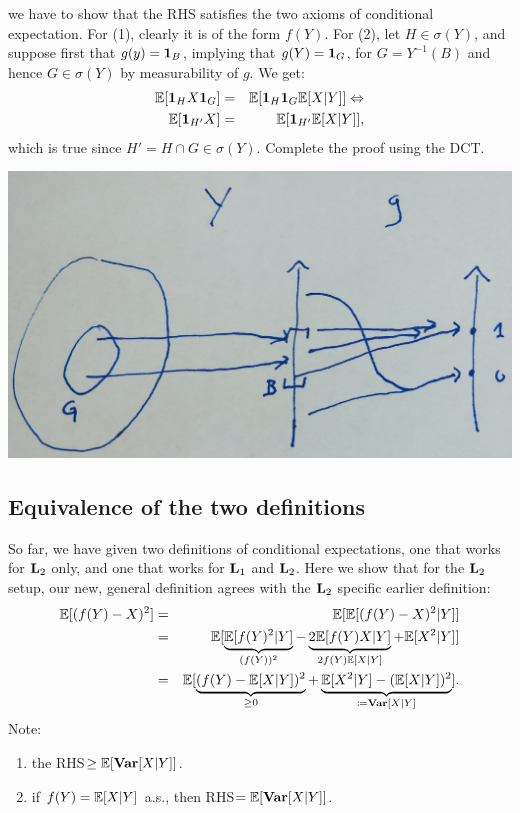 \documentclass{article}
\begin{document}
 we have to show that the RHS satisfies the two axioms of conditional expectation. For (1), clearly it is of the form $f(Y)$. For (2), let $H \in \sigma(Y)$, and suppose first that $g(y) = {\mathbf 1}_B$, implying that $g(Y) = {\mathbf 1}_G$, for $G = Y^{-1}(B)$ and hence $G \in \sigma(Y)$ by measurability of $g$. We get:
\begin{eqnarray*}
{\mathbb E}[ {\mathbf 1}_H X {\mathbf 1}_G ] &=& {\mathbb E}[ {\mathbf 1}_H {\mathbf 1}_G {\mathbb E}[X|Y] ] \Leftrightarrow \\
{\mathbb E}[ {\mathbf 1}_{H'} X ] &=& {\mathbb E}[ {\mathbf 1}_{H'} {\mathbb E}[X|Y] ],
\end{eqnarray*}
which is true since $H' = H \cap G \in \sigma(Y)$. Complete the proof using the DCT.
\begin{center}
	\includegraphics[width=0.6\linewidth]{figures/cond-exp-property} 
\end{center}


\subsection{Equivalence of the two definitions}

So far, we have given two definitions of conditional expectations, one that works for $\mathbf L_2$ only, and one that works for $\mathbf L_1$ and $\mathbf L_2$. Here we show that for the $\mathbf L_2$ setup, our new, general definition agrees with the $\mathbf L_2$ specific earlier definition:
\begin{eqnarray*}
{\mathbb E}[ (f(Y) - X)^2 ] &=& {\mathbb E}[ {\mathbb E}[ (f(Y) - X)^2 | Y ]] \\
&=& {\mathbb E} [ \underbrace{ {\mathbb E}[ f(Y)^2 | Y ]}_{(f(Y))^2} - \underbrace{ 2 {\mathbb E}[ f(Y) X | Y] }_{2 f(Y) {\mathbb E}[X|Y]} + {\mathbb E}[ X^2 | Y] ] \\
&=& {\mathbb E}[ \underbrace{(f(Y) - {\mathbb E}[X|Y])^2}_{\ge 0} + \underbrace{ {\mathbb E}[X^2 | Y] - ({\mathbb E}[X|Y])^2 }_{\coloneqq {\text {\bf Var}}[X|Y]} ].
\end{eqnarray*}
Note:
\begin{enumerate}
  \item the RHS$\ge {\mathbb E}[ {\text {\bf Var}}[X|Y]]$.
  \item if $f(Y) = {\mathbb E}[X|Y]$ a.s., then RHS$={\mathbb E}[{\text {\bf Var}}[X|Y]]$.
\end{enumerate}
\end{document}
